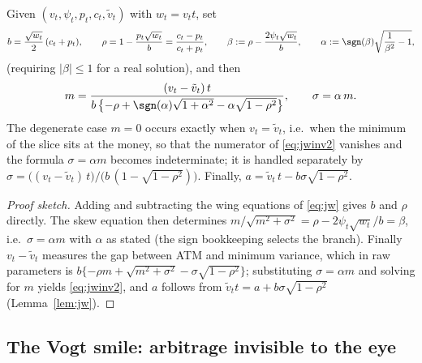 \begin{lemma}\label{lem:jwinv}
Given $(v_t,\psi_t,p_t,c_t,\tilde v_t)$ with $w_t=v_tt$, set
\begin{equation}\label{eq:jwinv}
b=\frac{\sqrt{w_t}}{2}\,(c_t+p_t),\qquad
\rho=1-\frac{p_t\sqrt{w_t}}{b}=\frac{c_t-p_t}{c_t+p_t},\qquad
\beta:=\rho-\frac{2\psi_t\sqrt{w_t}}{b},\qquad
\alpha:=\sgn(\beta)\sqrt{\frac1{\beta^2}-1},
\end{equation}
(requiring $|\beta|\le1$ for a real solution), and then
\begin{equation}\label{eq:jwinv2}
m=\frac{(v_t-\tilde v_t)\,t}
{b\,\bigl\{-\rho+\sgn(\alpha)\sqrt{1+\alpha^2}-\alpha\sqrt{1-\rho^2}\bigr\}},\qquad
\sigma=\alpha\,m.
\end{equation}
The degenerate case $m=0$ occurs exactly when $v_t=\tilde v_t$, i.e.\ when the minimum of the
slice sits at the money, so that the numerator of \eqref{eq:jwinv2} vanishes and the formula
$\sigma=\alpha m$ becomes indeterminate; it is handled separately by
$\sigma=\bigl((v_t-\tilde v_t)\,t\bigr)/\bigl(b\,(1-\sqrt{1-\rho^2})\bigr)$. Finally,
$a=\tilde v_t\,t-b\sigma\sqrt{1-\rho^2}$.
\end{lemma}

\begin{proof}[Proof sketch]
Adding and subtracting the wing equations of \eqref{eq:jw} gives $b$ and $\rho$ directly. The
skew equation then determines $m/\sqrt{m^2+\sigma^2}=\rho-2\psi_t\sqrt{w_t}/b=\beta$, i.e.\
$\sigma=\alpha m$ with $\alpha$ as stated (the sign bookkeeping selects the branch). Finally
$v_t-\tilde v_t$ measures the gap between ATM and minimum variance, which in raw parameters is
$b\{-\rho m+\sqrt{m^2+\sigma^2}-\sigma\sqrt{1-\rho^2}\}$; substituting $\sigma=\alpha m$ and
solving for $m$ yields \eqref{eq:jwinv2}, and $a$ follows from
$\tilde v_tt=a+b\sigma\sqrt{1-\rho^2}$ (Lemma~\ref{lem:jw}).
\end{proof}

\subsection{The Vogt smile: arbitrage invisible to the eye}

